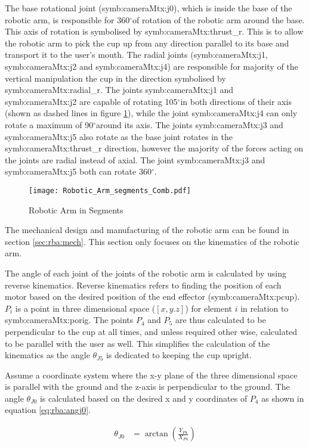 \documentclass{article}
\newcommand{\sba}[1]{\gls{symb:cameraMtx:#1}}          %
\newcommand{\degrs}{\ensuremath{^{\circ}}}
\begin{document}
The base rotational joint (\sba{j0}), which is inside the base of the robotic arm, is responsible for 360\degrs of rotation of the robotic arm around the base.  This axis of rotation is symbolised by \sba{thrust_r}.  This is to allow the robotic arm to pick the cup up from any direction parallel to its base and transport it to the user's mouth.  The radial joints (\sba{j1}, \sba{j2} and \sba{j4}) are responsible for majority of the vertical manipulation the cup in the direction symbolised by \sba{radial_r}.  The joints \sba{j1} and \sba{j2} are capable of rotating 105\degrs in both directions of their axis (shown as dashed lines in figure \ref{fig:arm:basestruct}), while the joint \sba{j4} can only rotate a maximum of 90\degrs around its axis.  The joints \sba{j3} and \sba{j5} also rotate as the base joint rotates in the \sba{thrust_r} direction, however the majority of the forces acting on the joints are radial instead of axial.  The joint \sba{j3} and \sba{j5} both can rotate 360\degrs.  

\begin{figure}[h]
\centering
    \texttt{[image: Robotic\_Arm\_segments\_Comb.pdf]} 
    \caption{Robotic Arm in Segments}
    \label{fig:arm:basestruct}
\end{figure}


The mechanical design and manufacturing of the robotic arm can be found in section \ref{sec:rba:mech}.  This section only focuses on the kinematics of the robotic arm.  

The angle of each joint of the joints of the robotic arm is calculated by using reverse kinematics.  Reverse kinematics refers to finding the position of each motor based on the desired position of the end effector (\sba{pcup}).  $P_i$ is a point in three dimensional space ($[x, y. z]$) for element $i$ in relation to \sba{porig}.  The points $P_4$ and $P_5$ are thus calculated to be perpendicular to the cup at all times, and unless required other wise, calculated to be parallel with the user as well.  This simplifies the calculation of the kinematics as the angle $\theta_{J5}$ is dedicated to keeping the cup upright.

Assume a coordinate system where the x-y plane of the three dimensional space is parallel with the ground and the z-axis is perpendicular to the ground.  The angle $\theta_{J0}$ is calculated based on the desired x and y coordinates of $P_4$ as shown in equation \ref{eq:rba:angj0}.  

\begin{align}
    \theta_{J0} &= \arctan(\frac{Y_{P4}}{X_{P4}}) \label{eq:rba:angj0}
\end{align}
\end{document}
